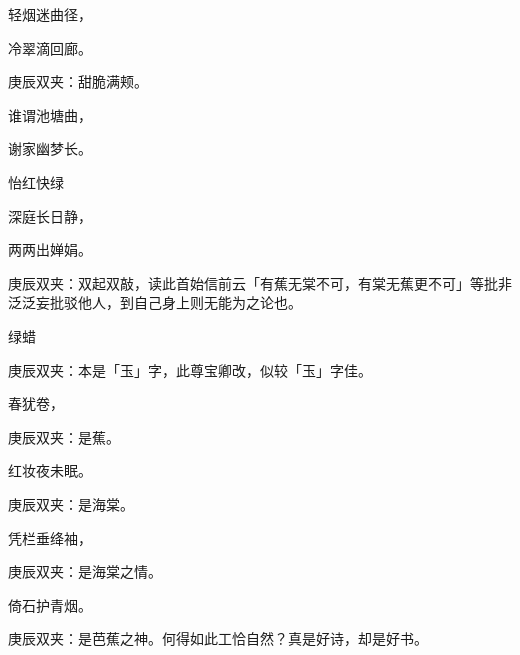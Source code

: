 \begin{poem}
    \begin{pl}轻烟迷曲径，\end{pl}

    \begin{pl}冷翠滴回廊。\end{pl}\begin{note}庚辰双夹：甜脆满颊。\end{note}

    \begin{pl}谁谓池塘曲，\end{pl}

    \begin{pl}谢家幽梦长。\end{pl}

    \begin{pl}怡红快绿\end{pl}

    \begin{pl}深庭长日静，\end{pl}

    \begin{pl}两两出婵娟。\end{pl}\begin{note}庚辰双夹：双起双敲，读此首始信前云「有蕉无棠不可，有棠无蕉更不可」等批非泛泛妄批驳他人，到自己身上则无能为之论也。\end{note}

    \begin{pl}绿蜡\end{pl}\begin{note}庚辰双夹：本是「玉」字，此尊宝卿改，似较「玉」字佳。\end{note}\begin{pl}春犹卷，\end{pl}\begin{note}庚辰双夹：是蕉。\end{note}

    \begin{pl}红妆夜未眠。\end{pl}\begin{note}庚辰双夹：是海棠。\end{note}

    \begin{pl}凭栏垂绛袖，\end{pl}\begin{note}庚辰双夹：是海棠之情。\end{note}

    \begin{pl}倚石护青烟。\end{pl}\begin{note}庚辰双夹：是芭蕉之神。何得如此工恰自然？真是好诗，却是好书。\end{note}


\end{poem}
